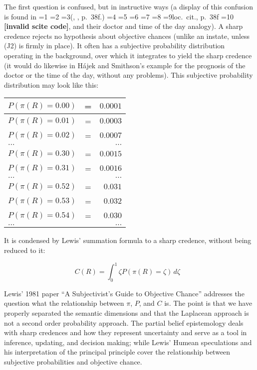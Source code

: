 \documentclass[journal]{IEEEtran}
\newcommand{\qeins}[1]{``#1''}
\newif\ifNumericalOrYear
\newcommand{\PageP}{p.~}
\newcommand{\PageP}{}
\newcommand{\scite}[3]{\ifnum#1=1\ifNumericalOrYear\citep{#2}\else\citeyearpar{#2}\fi\else
\ifnum#1=2\ifNumericalOrYear\citep[#3]{#2}\else\citep[{\PageP}#3]{#2}\fi\else
\ifnum#1=3\ifNumericalOrYear(\citet[#3]{#2})\else(\citeauthor{#2}, \citeyear{#2}, {\PageP}#3.)\fi\else
\ifnum#1=4\ifNumericalOrYear\citet{#2}\else\citet{#2}\fi\else
\ifnum#1=5\ifNumericalOrYear(\citet{#2})\else\citep{#2}\fi\else
\ifnum#1=6\ifNumericalOrYear(\citet[#3]{#2})\else\citep[{\PageP}#3]{#2}\fi\else
\ifnum#1=7\ifNumericalOrYear\citep{#2}\else\citealp{#2}\fi\else
\ifnum#1=8\ifNumericalOrYear\citep[#3]{#2}\else\citealp[{\PageP}#3]{#2}\fi\else
\ifnum#1=9\ifNumericalOrYear\citep[#3]{#2}\else{}loc.\ cit., {\PageP}#3\fi\else
\ifnum#1=10\ifNumericalOrYear\citep{#2}\else\citeyear{#2}\fi\else
\textbf{[invalid scite code]}\fi\fi\fi\fi\fi\fi\fi\fi\fi\fi}
\begin{document}
The first question is confused, but in instructive ways (a display of
this confusion is found in \scite{8}{hajeksmithson12}{38f}, and their
doctor and time of the day analogy). A sharp credence rejects no
hypothesis about objective chances (unlike an instate, unless (J2) is
firmly in place). It often has a subjective probability distribution
operating in the background, over which it integrates to yield the
sharp credence (it would do likewise in H{\'a}jek and Smithson's
example for the prognosis of the doctor or the time of the day,
without any problems). This subjective probability
distribution may look like this:

\begin{tabular}{|lcr|}
  \hline
  $P(\pi(R)=0.00)$ & = & $0.0001$ \\ \hline
  $P(\pi(R)=0.01)$ & = & $0.0003$ \\ \hline
  $P(\pi(R)=0.02)$ & = & $0.0007$ \\ \hline
  $\ldots$ & & $\ldots$ \\ \hline
  $P(\pi(R)=0.30)$ & = & $0.0015$ \\ \hline
  $P(\pi(R)=0.31)$ & = & $0.0016$ \\ \hline
  $\ldots$ & & $\ldots$ \\ \hline
  $P(\pi(R)=0.52)$ & = & $0.031$ \\ \hline
  $P(\pi(R)=0.53)$ & = & $0.032$ \\ \hline
  $P(\pi(R)=0.54)$ & = & $0.030$ \\ \hline
  $\ldots$ & & $\ldots$ \\ \hline
\end{tabular}

It is condensed by Lewis' summation formula to a sharp credence,
without being reduced to it:

\begin{equation}
  \label{eq:s2}
  C(R)=\int_{0}^{1}\zeta{}P(\pi(R)=\zeta)\,d\zeta\mbox{ }
\end{equation}

Lewis' 1981 paper \qeins{A Subjectivist's Guide to Objective Chance}
addresses the question what the relationship between $\pi$, $P$, and
$C$ is. The point is that we have properly separated the semantic
dimensions and that the Laplacean approach is not a second order
probability approach. The partial belief epistemology deals with sharp
credences and how they represent uncertainty and serve as a tool in
inference, updating, and decision making; while Lewis' Humean
speculations and his interpretation of the principal principle cover
the relationship between subjective probabilities and objective
chance.
\end{document}
